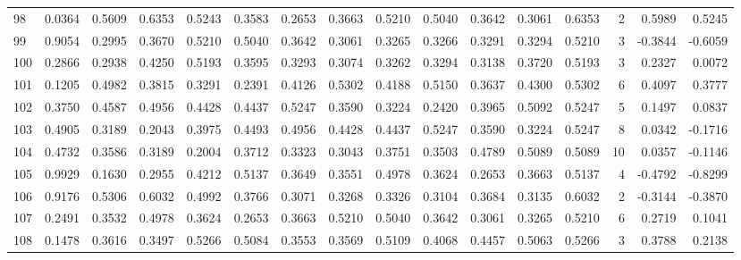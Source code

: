 \begin{tabular}{lrrrrrrrrrrrrrrr}
98  &      0.0364 &  0.5609 &  0.6353 &  0.5243 &  0.3583 &  0.2653 &  0.3663 &  0.5210 &  0.5040 &  0.3642 &   0.3061 &     0.6353 &      2 &                    0.5989 &                     0.5245 \\
99  &      0.9054 &  0.2995 &  0.3670 &  0.5210 &  0.5040 &  0.3642 &  0.3061 &  0.3265 &  0.3266 &  0.3291 &   0.3294 &     0.5210 &      3 &                   -0.3844 &                    -0.6059 \\
100 &      0.2866 &  0.2938 &  0.4250 &  0.5193 &  0.3595 &  0.3293 &  0.3074 &  0.3262 &  0.3294 &  0.3138 &   0.3720 &     0.5193 &      3 &                    0.2327 &                     0.0072 \\
101 &      0.1205 &  0.4982 &  0.3815 &  0.3291 &  0.2391 &  0.4126 &  0.5302 &  0.4188 &  0.5150 &  0.3637 &   0.4300 &     0.5302 &      6 &                    0.4097 &                     0.3777 \\
102 &      0.3750 &  0.4587 &  0.4956 &  0.4428 &  0.4437 &  0.5247 &  0.3590 &  0.3224 &  0.2420 &  0.3965 &   0.5092 &     0.5247 &      5 &                    0.1497 &                     0.0837 \\
103 &      0.4905 &  0.3189 &  0.2043 &  0.3975 &  0.4493 &  0.4956 &  0.4428 &  0.4437 &  0.5247 &  0.3590 &   0.3224 &     0.5247 &      8 &                    0.0342 &                    -0.1716 \\
104 &      0.4732 &  0.3586 &  0.3189 &  0.2004 &  0.3712 &  0.3323 &  0.3043 &  0.3751 &  0.3503 &  0.4789 &   0.5089 &     0.5089 &     10 &                    0.0357 &                    -0.1146 \\
105 &      0.9929 &  0.1630 &  0.2955 &  0.4212 &  0.5137 &  0.3649 &  0.3551 &  0.4978 &  0.3624 &  0.2653 &   0.3663 &     0.5137 &      4 &                   -0.4792 &                    -0.8299 \\
106 &      0.9176 &  0.5306 &  0.6032 &  0.4992 &  0.3766 &  0.3071 &  0.3268 &  0.3326 &  0.3104 &  0.3684 &   0.3135 &     0.6032 &      2 &                   -0.3144 &                    -0.3870 \\
107 &      0.2491 &  0.3532 &  0.4978 &  0.3624 &  0.2653 &  0.3663 &  0.5210 &  0.5040 &  0.3642 &  0.3061 &   0.3265 &     0.5210 &      6 &                    0.2719 &                     0.1041 \\
108 &      0.1478 &  0.3616 &  0.3497 &  0.5266 &  0.5084 &  0.3553 &  0.3569 &  0.5109 &  0.4068 &  0.4457 &   0.5063 &     0.5266 &      3 &                    0.3788 &                     0.2138 \\

\end{tabular}
